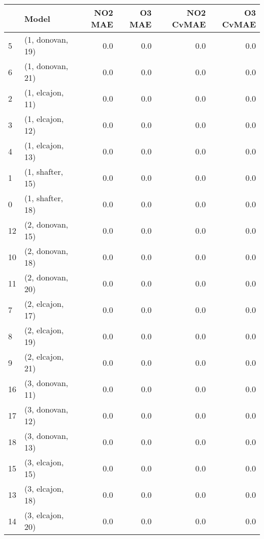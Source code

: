 \begin{tabular}{llrrrr}
\toprule
{} &             Model &  NO2 MAE &  O3 MAE &  NO2 CvMAE &  O3 CvMAE \\
\midrule
5  &  (1, donovan, 19) &      0.0 &     0.0 &        0.0 &       0.0 \\
6  &  (1, donovan, 21) &      0.0 &     0.0 &        0.0 &       0.0 \\
2  &  (1, elcajon, 11) &      0.0 &     0.0 &        0.0 &       0.0 \\
3  &  (1, elcajon, 12) &      0.0 &     0.0 &        0.0 &       0.0 \\
4  &  (1, elcajon, 13) &      0.0 &     0.0 &        0.0 &       0.0 \\
1  &  (1, shafter, 15) &      0.0 &     0.0 &        0.0 &       0.0 \\
0  &  (1, shafter, 18) &      0.0 &     0.0 &        0.0 &       0.0 \\
12 &  (2, donovan, 15) &      0.0 &     0.0 &        0.0 &       0.0 \\
10 &  (2, donovan, 18) &      0.0 &     0.0 &        0.0 &       0.0 \\
11 &  (2, donovan, 20) &      0.0 &     0.0 &        0.0 &       0.0 \\
7  &  (2, elcajon, 17) &      0.0 &     0.0 &        0.0 &       0.0 \\
8  &  (2, elcajon, 19) &      0.0 &     0.0 &        0.0 &       0.0 \\
9  &  (2, elcajon, 21) &      0.0 &     0.0 &        0.0 &       0.0 \\
16 &  (3, donovan, 11) &      0.0 &     0.0 &        0.0 &       0.0 \\
17 &  (3, donovan, 12) &      0.0 &     0.0 &        0.0 &       0.0 \\
18 &  (3, donovan, 13) &      0.0 &     0.0 &        0.0 &       0.0 \\
15 &  (3, elcajon, 15) &      0.0 &     0.0 &        0.0 &       0.0 \\
13 &  (3, elcajon, 18) &      0.0 &     0.0 &        0.0 &       0.0 \\
14 &  (3, elcajon, 20) &      0.0 &     0.0 &        0.0 &       0.0 \\
\bottomrule
\end{tabular}
